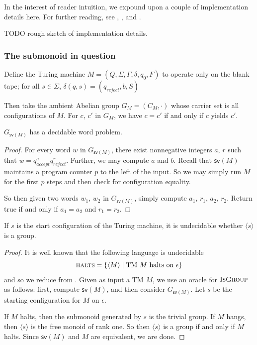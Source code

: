 \documentclass[11pt]{article}
\begin{document}
In the interest of reader intuition, we expound upon a couple of
implementation details here. For further reading, see
\cite{davis:note_utm}, \cite{davis:defn_utm}, and
\cite{shepherdson:machine_config}.

TODO rough sketch of implementation details.

\subsubsection*{The submonoid in question}
Define the Turing machine $M = (Q, \Sigma, \Gamma, \delta, q_0, F)$ to
operate only on the blank tape; for all $s \in \Sigma$,
$\delta(q, s) = (q_{reject}, b, S)$


Then take the ambient Abelian group $G_M = (C_M, \cdot)$ whose carrier
set is all configurations of $M$. For $c$, $c'$ in $G_M$, we have
$c = c'$ if and only if $c$ yields $c'$.

\begin{proposition}
  $G_{\textsf{sv}(M)}$ has a decidable word problem.
\end{proposition}

\begin{proof}
  For every word $w$ in $G_{\textsf{sv}(M)}$, there exist nonnegative
  integers $a$, $r$ such that $w = q_{accept}^a
  q_{reject}^r$. Further, we may compute $a$ and $b$. Recall that
  $\textsf{sv}(M)$ maintains a program counter $p$ to the left of the
  input. So we may simply run $M$ for the first $p$ steps and then
  check for configuration equality.

  So then given two words $w_1$, $w_2$ in $G_{\textsf{sv}(M)}$, simply
  compute $a_1$, $r_1$, $a_2$, $r_2$. Return true if and only if
  $a_1 = a_2$ and $r_1 = r_2$.
\end{proof}

\begin{proposition}
If $s$ is the start configuration of the Turing
machine, it is undecidable whether $\langle s \rangle$ is a group.
\end{proposition}

\begin{proof}
  It is well known that the following language is undecidable
  \[
    \textsc{halts} = \{\langle M \rangle \mid \text{TM $M$ halts on
      $\epsilon$} \}
  \]
  and so we reduce from . Given as input a TM $M$, we
  use an oracle for $\textsc{IsGroup}$ as follows: first, compute
  $\textsf{sv}(M)$, and then consider $G_{\textsf{sv}(M)}$. Let $s$ be
  the starting configuration for $M$ on $\epsilon$.

  If $M$ halts, then the submonoid generated by $s$ is the trivial
  group. If $M$ hangs, then $\langle s \rangle$ is the free monoid of
  rank one. So then $\langle s \rangle$ is a group if and only if $M$
  halts. Since $\textsf{sv}(M)$ and $M$ are equivalent, we are done.
\end{proof}
\end{document}
